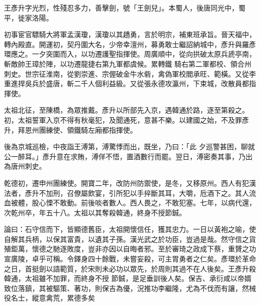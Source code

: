 \begin{pinyinscope}
 王彥升字光烈，性殘忍多力，善擊劍，號「王劍兒」。本蜀人，後唐同光中，蜀平，徙家洛陽。



 初事宦官驃騎大將軍孟漢瓊，漢瓊以其趫勇，言於明宗，補東班承旨。晉天福中，轉內殿直。開運初，契丹圍大名，少帝幸澶州，募勇敢士繼詔納城中，彥升與羅彥環應之。一夕突圍而入，以功遷護聖指揮使。周廣順中，從向拱破太原兵虒亭南，斬敵帥王璋於陣，以功遷龍捷右第九軍都虞候。累轉鐵
 騎右第二軍都校、領合州刺史。世宗征淮南，從劉崇進、宗偓破金牛水砦，禽偽軍校閻承旺、範橫。又從李重進捍吳兵於盛唐，斬二千人個利益級。又從張永德攻瀛州，下束城，改散員都指揮使。



 太祖北征，至陳橋，為眾推戴。彥升以所部先入京，遇韓通於路，逐至第殺之。初，太祖誓軍入京不得有秋毫犯，及聞通死，意甚不樂。以建國之始，不及罪彥升，拜恩州團練使、領鐵騎左廂都指揮使。



 後為京城巡檢，中夜詣王溥第，溥驚悸而出，既坐，乃曰：「此
 夕巡警甚困，聊就公一醉耳。」彥升意在求賄，溥佯不悟，置酒數行而罷。翌日，溥密奏其事，乃出為唐州刺史。



 乾德初，遷申州團練使。開寶二年，改防州防禦使，是冬，又移原州。西人有犯漢法者，彥升不加刑，召僚屬飲宴，引所犯以手捽斷其耳，大嚼，卮酒下之。其人流血被體，股心慄不敢動。前後啖者數人。西人畏之，不敢犯塞。七年，以病代還，次乾州卒，年五十八。太祖以其奪殺韓通，終身不授節鋮。



 論曰：石守信而下，皆顯德舊臣，太祖開懷信任，獲其忠力。一日以黃袍之喻，使自解其兵柄，以保其富貴，以遺其子孫。漢光武之於功臣，豈過是哉。然守信之貨殖鉅萬，懷德之馳逐敗度，豈非亦因以自晦者邪。至於審琦之政成下蔡，重贇之功宣廣陵，卓乎可稱。令鐸身四十餘戰，未嘗妄殺，可主胃勇者之仁矣。彥環於革命之日，首挺劍以語範質，於宋則未必功以眾先，於周則其過不在人後矣。王彥升殺韓通，太祖雖不加罪，而終身不授
 節鋮，是足垂訓後人矣。保吉、承衍咸以帝婿致位落鎮，其被驅策、著功，則保吉為優，況推功李繼隆，尤為不伐而有讓，然械役名士，縱意禽荒，累德多矣



\end{pinyinscope}